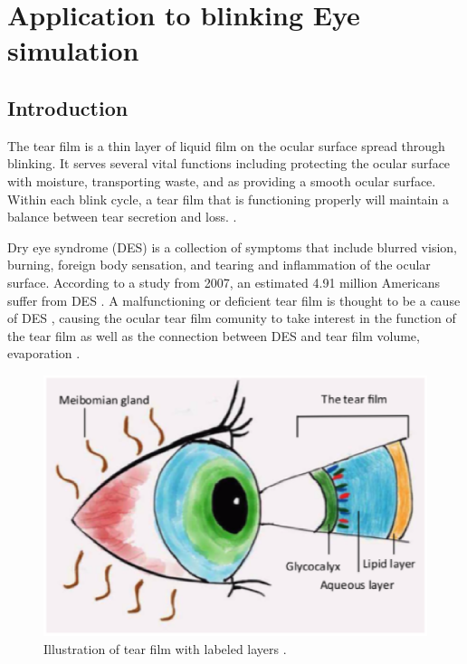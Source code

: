 \chapter{Application to blinking Eye simulation}
\label{chap_eye}

\section{Introduction}

The tear film is a thin layer of liquid film on the ocular surface spread through blinking. It serves several vital functions including protecting the ocular surface with moisture, transporting waste, and as providing a smooth ocular surface. Within each blink cycle, a tear film that is functioning properly will maintain a balance between tear secretion and loss. \cite{holly1977tear}.

	Dry eye syndrome (DES) is a collection of symptoms that include blurred vision, burning, foreign body sensation, and tearing and inflammation of the ocular surface. According to a study from 2007, an estimated 4.91 million Americans suffer from DES \cite{bron2007methodologies}. A malfunctioning or deficient tear film is thought to be a cause of DES \cite{nelson2011international}, causing the ocular tear film comunity to take interest in the function of the tear film \cite{johnson2004changes} as well as the connection between DES and tear film volume, evaporation \cite{bron2007methodologies}.
	
\begin{figure}
  \centering
  \includegraphics[scale=0.6]{Chapter4/eye_model.eps}
  \caption{Illustration of tear film with labeled layers \cite{zhong2018dynamics}.}
  \label{eye_levels}
\end{figure}

